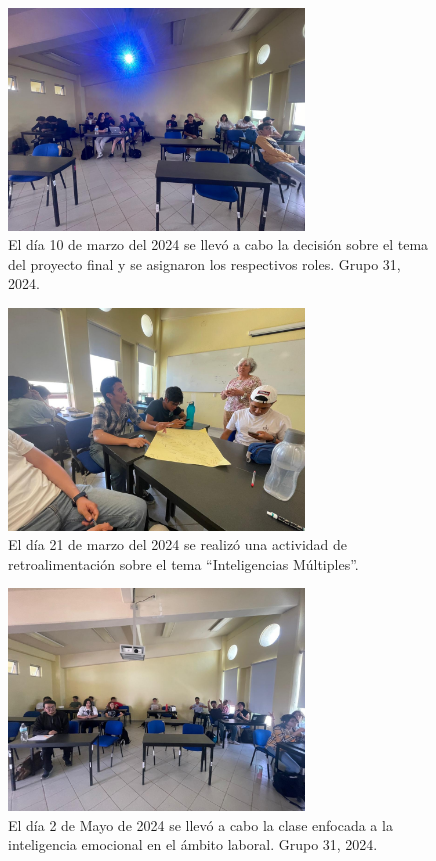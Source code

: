 \begin{figure}
    \caption{El d\'ia 10 de marzo del 2024 se llev\'o a cabo la decisi\'on sobre el tema del proyecto final y se asignaron los respectivos roles. Grupo 31, 2024.\label{fig:No.1}}
    \includegraphics[width=0.7\textwidth]{./assets/img/imagen2DH.jpeg}
\end{figure}

\begin{figure}
    \caption{El d\'ia 21 de marzo del 2024 se realiz\'o una actividad de retroalimentaci\'on sobre el tema ``Inteligencias M\'ultiples''.\label{fig:No.2}}
    \includegraphics[width=0.7\textwidth]{./assets/img/imagen1DH.jpeg}
\end{figure}

\begin{figure}
    \caption{El d\'ia 2 de Mayo de 2024 se llev\'o a cabo la clase enfocada a la inteligencia emocional en el ámbito laboral. Grupo 31, 2024.\label{fig:No.3}}
    \includegraphics[width=0.7\textwidth]{./assets/img/imagen3DH.jpeg}
\end{figure}

